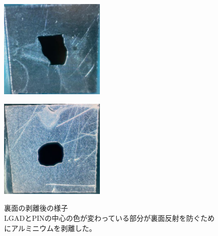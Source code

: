 \begin{figure}[h]
    \begin{minipage}[b]{0.5\linewidth}
        \centering
        \includegraphics[width=5cm]{fig/ch4/PIN_back.jpg}
        \label{fg:PIN_back}
    \end{minipage}
    \begin{minipage}[b]{0.5\linewidth}
        \centering
        \includegraphics[width=5cm]{fig/ch4/APD_back.jpg}
        \label{fg:APD_back}
    \end{minipage}
    \caption[裏面の剥離後の様子]{裏面の剥離後の様子\\LGADとPINの中心の色が変わっている部分が裏面反射を防ぐためにアルミニウムを剥離した。}
    \label{fg:back}
\end{figure}

